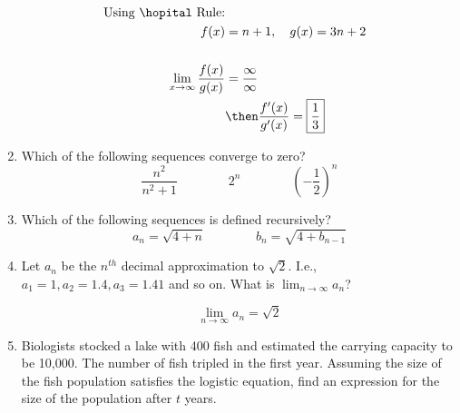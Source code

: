 \documentclass{nosvagor-notes}
\begin{document}
\begin{enumerate}
    \begin{align*}
      ~\text{Using \hopital Rule:}\\
      f(x) &= n+1, \quad g(x) = 3n+2 \\\\
      \lim_{x \to \infty} \frac{f(x)}{g(x)} &= \frac{\infty}{\infty} \\
      &\then \frac{f'(x)}{g'(x)} = \boxed{\frac{1}{3}}
    \end{align*}

    \vspace{30pt}

  \item Which of the following sequences converge to zero?
    \[%
      \frac{n^2}{n^2+1} \qquad\qquad 2^n \qquad\qquad \boxed{\left( -\frac{1}{2} \right) ^n}
    \]%
    \vspace{10pt}

  \item Which of the following sequences is defined recursively?
    \[%
      a_n = \sqrt{4+n} \qquad \qquad \boxed{b_n = \sqrt{4+b_{n-1}}}
    \]%
    \vspace{10pt}

  \item Let \(a_n\) be the \(n^{th}\) decimal approximation to \(\sqrt{2} \).
    I.e., \(a_1 = 1, a_2 = 1.4, a_3 = 1.41\) and so on. What is \(\lim_{n \to
    \infty} a_n\)?

    \[\boxed{\lim_{n \to \infty} a_n = \sqrt{2} }\]
  \newpage

  \item Biologists stocked a lake with 400 fish and estimated the carrying
    capacity to be 10,000. The number of fish tripled in the first year.
    Assuming the size of the fish population satisfies the logistic equation,
    find an expression for the size of the population after \(t\) years.
    \vspace{10pt}


\end{enumerate}
\end{document}
